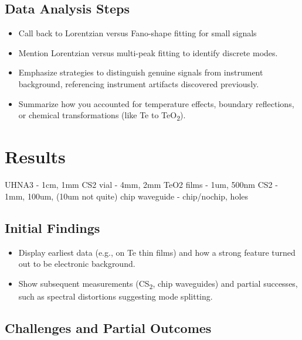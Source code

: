 \subsection{Data Analysis Steps}
\label{subsec:Raman:DataAnalysisSteps}

\begin{itemize}
  \item Call back to Lorentzian versus Fano-shape fitting for small signals
  \item Mention Lorentzian versus multi-peak fitting to identify discrete modes.
  \item Emphasize strategies to distinguish genuine signals from instrument background, referencing instrument artifacts discovered previously.
  \item Summarize how you accounted for temperature effects, boundary reflections, or chemical transformations (like Te to TeO\textsubscript{2}).
\end{itemize}


\section{Results}
\label{sec:Raman:Results}

UHNA3 - 1cm, 1mm
CS2 vial - 4mm, 2mm
TeO2 films - 1um, 500nm
CS2 - 1mm, 100um, (10um not quite)
chip waveguide - chip/nochip, holes

\subsection{Initial Findings}
\label{subsec:Raman:InitialFindings}

\begin{itemize}
  \item Display earliest data (e.g., on Te thin films) and how a strong feature turned out to be electronic background.
  \item Show subsequent measurements (CS\textsubscript{2}, chip waveguides) and partial successes, such as spectral distortions suggesting mode splitting.
\end{itemize}

\subsection{Challenges and Partial Outcomes}
\label{subsec:Raman:ChallengesandPartialOutcomes}

